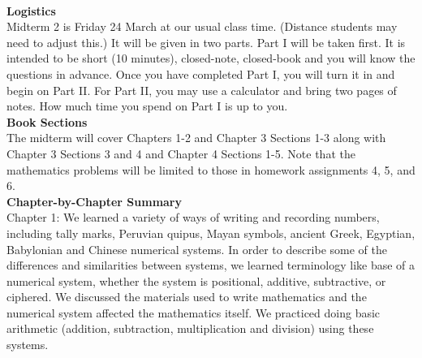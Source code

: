 \documentclass[11pt,fleqn]{article}
\begin{document}
\renewcommand{\headrulewidth}{0pt}
\newcommand{\blank}[1]{\rule{#1}{0.75pt}}
\newcommand{\bc}{\begin{center}}
\newcommand{\ec}{\end{center}}
\renewcommand{\d}{\displaystyle}

\vspace*{-0.7in}

\begin{center}
  \large
  \\
\end{center}
\noindent\textbf{Logistics}\\

Midterm 2 is Friday 24 March at our usual class time. (Distance students may need to adjust this.) It will be given in two parts. Part I will be taken first. It is intended to be short (10 minutes), closed-note, closed-book and you will know the questions in advance. Once you have completed Part I, you will turn it in and begin on Part II.  For Part II, you may use a calculator and bring two pages of notes. How much time you spend on Part I is up to you.  \\

\noindent\textbf{Book Sections}\\

The midterm will cover Chapters 1-2 and Chapter 3 Sections 1-3 along with Chapter 3 Sections 3 and 4 and Chapter 4 Sections 1-5. Note that the mathematics problems will be limited to those in homework assignments 4, 5, and 6.\\

\noindent\textbf{Chapter-by-Chapter Summary}\\

Chapter 1: We learned a variety of ways of writing and recording numbers, including tally marks,  Peruvian quipus, Mayan symbols, ancient Greek, Egyptian, Babylonian and Chinese numerical systems. In order to describe some of the differences and similarities between systems, we learned terminology like base of a numerical system, whether the system is positional, additive, subtractive,  or ciphered. We discussed the materials used to write mathematics and the numerical system affected the mathematics itself. We practiced doing basic arithmetic (addition, subtraction, multiplication and division) using these systems.\\
\end{document}
